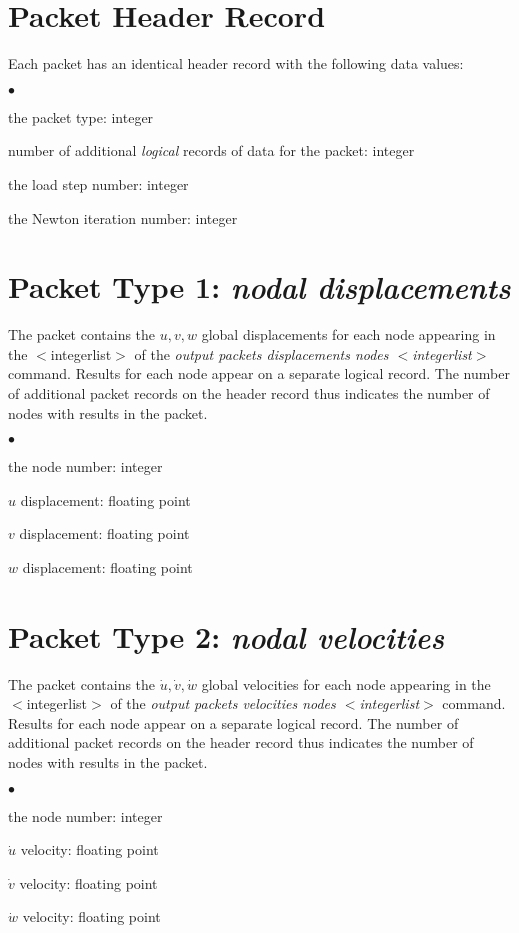 \documentclass[10pt]{report}
\numberwithin{equation}{section}
\newcommand{\ti}{\emph}
\newcommand{\squishlist}{
 \begin{list}{$\bullet$}
  { \setlength{\itemsep}{0pt}
     \setlength{\parsep}{3pt}
     \setlength{\topsep}{3pt}
     \setlength{\partopsep}{0pt}
     \setlength{\leftmargin}{1.5em}
     \setlength{\labelwidth}{1em}
     \setlength{\labelsep}{0.5em} } }
\newcommand{\squishend}{
  \end{list}  }
\begin{document}
%
%
\section{Packet Header Record}
Each packet has an identical header record with the following data values:
\squishlist
\item the packet type:  integer
\item number of additional \ti{logical} records of data for the packet:  integer
\item the load step number:  integer
\item the Newton iteration number:  integer
\squishend

%
%
\section{Packet Type 1: \ti{nodal displacements}}
The packet contains the $u,v,w$ global displacements for each node 
appearing in the $<$integerlist$>$ of the \ti{output packets 
displacements nodes $<$integerlist$>$ } command. 
Results for each node appear on a separate logical record. The number of additional 
packet records on the header record thus indicates the number of 
nodes with results in the packet.
\squishlist
\item the node number:  integer
\item $u$ displacement:  floating point
\item $v$ displacement:  floating point
\item $w$ displacement:  floating point
\squishend

%
%
\section{Packet Type 2: \ti{nodal velocities}}
The packet contains the $\dot u, \dot v, \dot w$ global velocities for each 
node appearing in the $<$integerlist$>$ of the \ti{output packets 
velocities nodes $<$integerlist$>$ } command. Results for each 
node appear on a separate logical record. The number of additional 
packet records on the header record thus indicates the number 
of nodes with results in the packet.
\squishlist
\item the node number:  integer
\item $\dot u$ velocity:  floating point
\item $\dot v$ velocity:  floating point
\item $\dot w$ velocity:  floating point
\squishend
\end{document}
